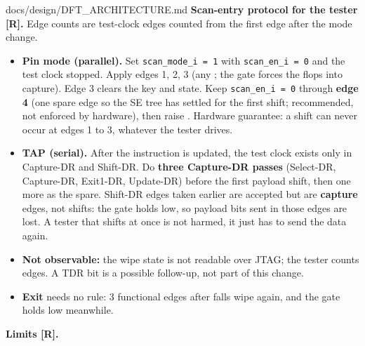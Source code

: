 \begin{relocated}{docs/design/DFT_ARCHITECTURE.md}
\textbf{Scan-entry protocol for the tester {[}R{]}.} Edge counts are
test-clock edges counted from the first edge after the mode change.

\begin{itemize}
\tightlist
\item
  \textbf{Pin mode (parallel).} Set
  \texttt{scan\_\allowbreak{}mode\_\allowbreak{}i\ =\allowbreak{}\ 1}
  with \texttt{scan\_\allowbreak{}en\_\allowbreak{}i\ =\allowbreak{}\ 0}
  and the test clock stopped. Apply  edges 1, 2, 3 (any
  ; the gate forces the flops into capture). Edge 3
  clears the key and state. Keep
  \texttt{scan\_\allowbreak{}en\_\allowbreak{}i\ =\allowbreak{}\ 0}
  through \textbf{edge 4} (one spare edge so the SE tree has settled for
  the first shift; recommended, not enforced by hardware), then raise
  . Hardware guarantee: a shift can never occur at edges
  1 to 3, whatever the tester drives.
\item
  \textbf{TAP (serial).} After the  instruction is updated,
  the test clock exists only in Capture-DR and Shift-DR. Do
  \textbf{three Capture-DR passes} (Select-DR, Capture-DR, Exit1-DR,
  Update-DR) before the first payload shift, then one more as the spare.
  Shift-DR edges taken earlier are accepted but are \textbf{capture}
  edges, not shifts: the gate holds  low, so payload bits
  sent in those edges are lost. A tester that shifts at once is not
  harmed, it just has to send the data again.
\item
  \textbf{Not observable:} the wipe state is not readable over JTAG; the
  tester counts edges. A  TDR bit is a possible
  follow-up, not part of this change.
\item
  \textbf{Exit} needs no rule: 3 functional  edges after
   falls wipe again, and the gate holds 
  low meanwhile.
\end{itemize}

\textbf{Limits {[}R{]}.}


\end{relocated}
